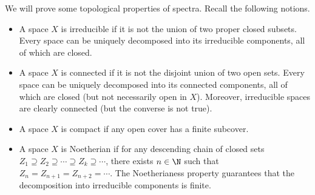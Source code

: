 \documentclass[a4paper]{article}
\begin{document}
We will prove some topological properties of spectra. Recall the following notions. 
\begin{itemize}
\item A space $X$ is irreducible if it is not the union of two proper closed subsets. Every space can be uniquely decomposed into its irreducible components, all of which are closed. 
\item A space $X$ is connected if it is not the disjoint union of two open sets. Every space can be uniquely decomposed into its connected components, all of which are closed (but not necessarily open in $X$). Moreover, irreducible spaces are clearly connected (but the converse is not true). 
\item A space $X$ is compact if any open cover has a finite subcover. 
\item A space $X$ is Noetherian if for any descending chain of closed sets $Z_1\supseteq Z_2\supseteq\cdots\supseteq Z_k\supseteq\cdots$, there exists $n\in\N$ such that $Z_n=Z_{n+1}=Z_{n+2}=\cdots$. The Noetherianess property guarantees that the decomposition into irreducible components is finite. 
\end{itemize}
\end{document}
